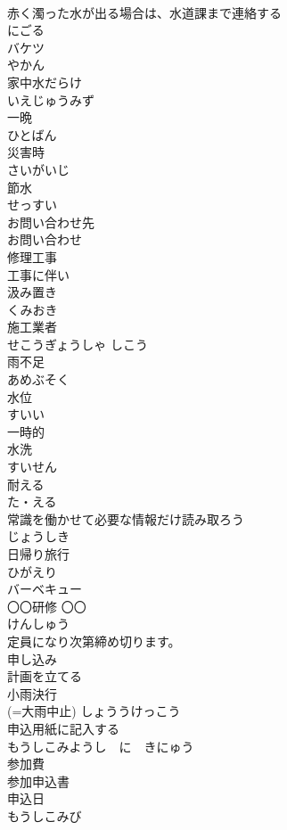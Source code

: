 \documentclass[8pt]{extreport}
\begin{document}
\begin{CJK}{UTF8}{min}
\\	赤く濁った水が出る場合は、水道課まで連絡する	
\\	にごる
\\	バケツ	
\\	やかん	
\\	家中水だらけ	
\\	いえじゅうみず
\\	一晩	
\\	ひとばん
\\	災害時	
\\	さいがいじ
\\	節水	
\\	せっすい
\\	お問い合わせ先	
\\	お問い合わせ	
\\	修理工事	
\\	工事に伴い	
\\	汲み置き	
\\	くみおき
\\	施工業者	
\\	せこうぎょうしゃ しこう
\\	雨不足	
\\	あめぶそく
\\	水位	
\\	すいい
\\	一時的	
\\	水洗	
\\	すいせん
\\	耐える	
\\	た・える
\\	常識を働かせて必要な情報だけ読み取ろう	
\\	じょうしき
\\	日帰り旅行	
\\	ひがえり
\\	バーベキュー	
\\	〇〇研修	〇〇
\\	けんしゅう
\\	定員になり次第締め切ります。	
\\	申し込み	
\\	計画を立てる	
\\	小雨決行	
\\	(=大雨中止) しょううけっこう
\\	申込用紙に記入する	
\\	もうしこみようし　に　きにゅう
\\	参加費	
\\	参加申込書	
\\	申込日	
\\	もうしこみび

\end{CJK}
\end{document}
